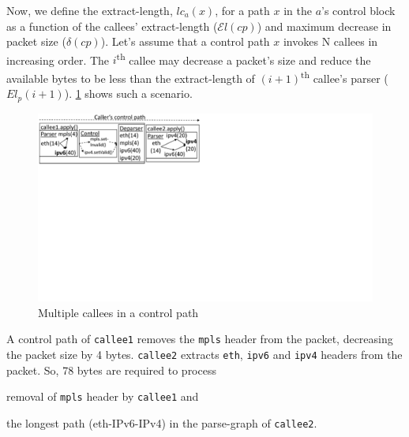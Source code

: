 \documentclass[letterpaper,twocolumn,10pt]{article}
\begin{document}

Now, we define the extract-length, $lc_{a}(x)$, for a path $x$ in the
\uprogram $a$'s control block as a function of the callees'
extract-length ($\mathcal{E}l(cp)$) and maximum decrease in packet
size ($\delta(cp)$). Let's assume that a control path $x$ invokes N
callees in increasing order.  The $i$\textsuperscript{th} callee may
decrease a packet's size and reduce the available bytes to be less
than the extract-length of $(i+1)$\textsuperscript{th} callee's parser
($El_{p}(i+1)$).  \cref{fig:sequential-callees} shows such a scenario.
\begin{figure}[!tbp]
    \centering
    \includegraphics[trim=0 396 487 0, clip,scale=0.5]{sequential-callees}
    \caption{Multiple callees in a control path}
    \label{fig:sequential-callees}
\end{figure}
A control path of \texttt{callee1} removes the \texttt{mpls} header
from the packet, decreasing the packet size by 4 bytes.
\texttt{callee2} extracts \texttt{eth}, \texttt{ipv6} and
\texttt{ipv4} headers from the packet. So, 78 bytes are required to
process
\begin{enumerate*}[label=(\roman*)]
  \item removal of \texttt{mpls} header by \texttt{callee1} and
  \item the longest path (eth-IPv6-IPv4) in the parse-graph of
    \texttt{callee2}.
\end{enumerate*}
\end{document}
